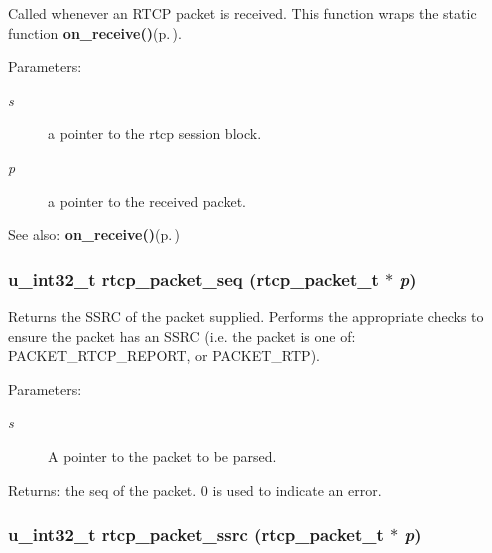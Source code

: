 Called whenever an RTCP packet is received. This function wraps the static function {\bf on\_\-receive()}{\rm (p.\,\pageref{rtcp_8c_a15})}. \begin{Desc}
\item[Parameters:]
\begin{description}
\item[{\em s}]a pointer to the rtcp session block. \item[{\em p}]a pointer to the received packet. \end{description}
\end{Desc}
\begin{Desc}
\item[See also:]{\bf on\_\-receive()}{\rm (p.\,\pageref{rtcp_8c_a15})} \end{Desc}
\subsubsection{\setlength{\rightskip}{0pt plus 5cm}u\_\-int32\_\-t rtcp\_\-packet\_\-seq ({\bf rtcp\_\-packet\_\-t} $\ast$ {\em p})\hspace{0.3cm}{\tt  [static]}}\label{rtcp_8c_a26}


Returns the SSRC of the packet supplied. Performs the appropriate checks to ensure the packet has an SSRC (i.e. the packet is one of: PACKET\_\-RTCP\_\-REPORT, or PACKET\_\-RTP). \begin{Desc}
\item[Parameters:]
\begin{description}
\item[{\em s}]A pointer to the packet to be parsed. \end{description}
\end{Desc}
\begin{Desc}
\item[Returns:]the seq of the packet. 0 is used to indicate an error. \end{Desc}
\subsubsection{\setlength{\rightskip}{0pt plus 5cm}u\_\-int32\_\-t rtcp\_\-packet\_\-ssrc ({\bf rtcp\_\-packet\_\-t} $\ast$ {\em p})\hspace{0.3cm}{\tt  [static]}}\label{rtcp_8c_a25}


